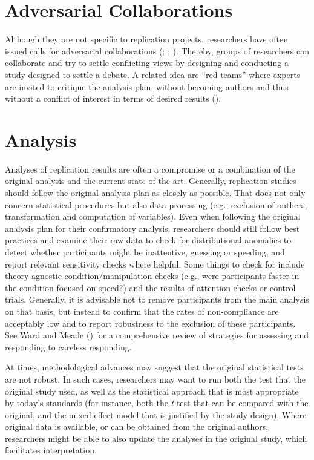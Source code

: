 \documentclass[
  letterpaper,
  DIV=11,
  openany,
  fontsize=12pt,
  parskip=half,
  headings=big,
  numbers=noenddot,
  titlepage=false]{scrreprt}
\begin{document}
\section{Adversarial Collaborations}\label{adversarial-collaborations}

Although they are not specific to replication projects, researchers have
often issued calls for adversarial collaborations
(;
;
).
Thereby, groups of researchers can collaborate and try to settle
conflicting views by designing and conducting a study designed to settle
a debate. A related idea are ``red teams'' where experts are invited to
critique the analysis plan, without becoming authors and thus without a
conflict of interest in terms of desired results
().

\section{Analysis}\label{analysis-1}

Analyses of replication results are often a compromise or a combination
of the original analysis and the current state-of-the-art. Generally,
replication studies should follow the original analysis plan as closely
as possible. That does not only concern statistical procedures but also
data processing (e.g., exclusion of outliers, transformation and
computation of variables). Even when following the original analysis
plan for their confirmatory analysis, researchers should still follow
best practices and examine their raw data to check for distributional
anomalies to detect whether participants might be inattentive, guessing
or speeding, and report relevant sensitivity checks where helpful. Some
things to check for include theory-agnostic condition/manipulation
checks (e.g., were participants faster in the condition focused on
speed?) and the results of attention checks or control trials.
Generally, it is advisable not to remove participants from the main
analysis on that basis, but instead to confirm that the rates of
non-compliance are acceptably low and to report robustness to the
exclusion of these participants. See Ward and Meade
() for a comprehensive review of
strategies for assessing and responding to careless responding.

At times, methodological advances may suggest that the original
statistical tests are not robust. In such cases, researchers may want to
run both the test that the original study used, as well as the
statistical approach that is most appropriate by today's standards (for
instance, both the \emph{t}-test that can be compared with the original,
and the mixed-effect model that is justified by the study design). Where
original data is available, or can be obtained from the original
authors, researchers might be able to also update the analyses in the
original study, which facilitates interpretation.
\end{document}

